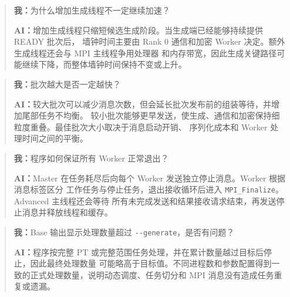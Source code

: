 \documentclass[12pt,a4paper]{ctexart}
\newcommand{\code}[1]{\nolinkurl{#1}}
\newenvironment{dialogue}
  {\begin{quote}\small\setlength{\parskip}{0.45em}}
  {\end{quote}}
\begin{document}
\begin{dialogue}
\textbf{我：}为什么增加生成线程不一定继续加速？

\textbf{AI：}增加生成线程只缩短候选生成阶段。当生成端已经能够持续提供 READY 批次后，
墙钟时间主要由 Rank 0 通信和加密 Worker 决定。额外生成线程还会与 MPI 主线程争用处理器
和内存带宽，因此生成关键路径可能继续下降，而整体墙钟时间保持不变或上升。
\end{dialogue}

\begin{dialogue}
\textbf{我：}批次越大是否一定越快？

\textbf{AI：}较大批次可以减少消息次数，但会延长批次发布前的组装等待，并增加尾部任务不均衡。
较小批次能够更早发送，使生成、通信和加密保持细粒度重叠。最佳批次大小取决于消息启动开销、
序列化成本和 Worker 处理时间之间的平衡。
\end{dialogue}

\begin{dialogue}
\textbf{我：}程序如何保证所有 Worker 正常退出？

\textbf{AI：}Master 在任务耗尽后向每个 Worker 发送独立停止消息。Worker 根据消息标签区分
工作任务与停止任务，退出接收循环后进入 \code{MPI\_Finalize}。Advanced 主线程还会等待
所有未完成发送和结果接收请求结束，再发送停止消息并释放线程和缓存。
\end{dialogue}

\begin{dialogue}
\textbf{我：}Base 输出显示处理数量超过 \code{--generate}，是否有问题？

\textbf{AI：}程序按完整 PT 或完整范围任务处理，并在累计数量越过目标后停止，因此最终处理数量
可能略高于目标值。不同进程数和参数配置得到一致的正式处理数量，说明动态调度、任务切分和
MPI 消息没有造成任务重复或遗漏。
\end{dialogue}
\end{document}

